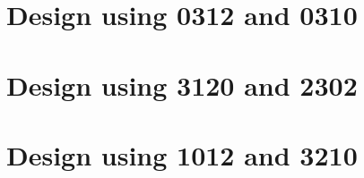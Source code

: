  \begin{center}




 \end{center}



\section{Design using 0312 and 0310}


 \begin{center}




 \end{center}



\section{Design using 3120 and 2302}


 \begin{center}




 \end{center}



\section{Design using 1012 and 3210}


 \begin{center}




 \end{center}



